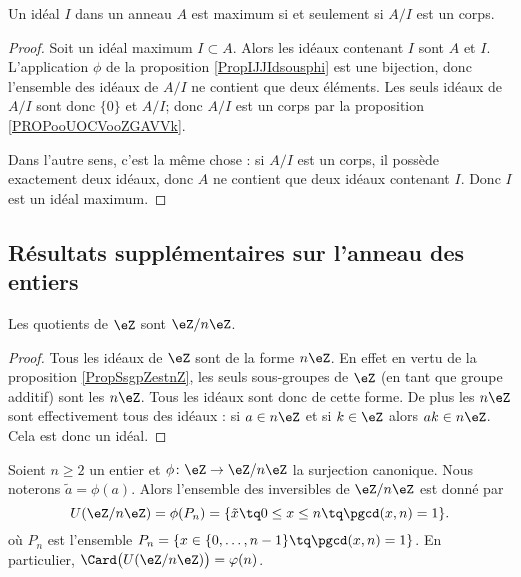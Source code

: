 \begin{proposition}     \label{PROPooSHHWooCyZPPw}
    Un idéal \( I\) dans un anneau $A$ est maximum si et seulement si \( A/I\) est un corps.
\end{proposition}

\begin{proof}
    Soit un idéal maximum \( I\subset A\). Alors les idéaux contenant \( I\) sont \( A\) et \( I\). L'application \( \phi\) de la proposition \ref{PropIJJIdsousphi} est une bijection, donc l'ensemble des idéaux de \( A/I\) ne contient que deux éléments. Les seuls idéaux de \( A/I\) sont donc \( \{ 0 \}\) et \( A/I\); donc \( A/I\) est un corps par la proposition \ref{PROPooUOCVooZGAVVk}.

    Dans l'autre sens, c'est la même chose : si \( A/I\) est un corps, il possède exactement deux idéaux, donc \( A\) ne contient que deux idéaux contenant $I$. Donc \( I\) est un idéal maximum.
\end{proof}

\subsection{Résultats supplémentaires sur l'anneau des entiers}

\begin{corollary}       \label{CORooLINXooBlUKPG}
    Les quotients de \( \eZ\) sont \( \eZ/n\eZ\).
\end{corollary}

\begin{proof}
    Tous les idéaux de \( \eZ\) sont de la forme \( n\eZ\). En effet en vertu de la proposition \ref{PropSsgpZestnZ}, les seuls sous-groupes de \( \eZ\) (en tant que groupe additif) sont les \( n\eZ\). Tous les idéaux sont donc de cette forme. De plus les \( n\eZ\) sont effectivement tous des idéaux : si \( a\in n\eZ\) et si \( k\in \eZ\) alors \( ak\in n\eZ\). Cela est donc un idéal.
\end{proof}

\begin{proposition}     \label{PropZpintssiprempUzn}
    Soient \( n\geq 2\) un entier et \( \phi\colon \eZ\to \eZ/n\eZ\) la surjection canonique. Nous noterons \( \tilde a=\phi(a)\). Alors l'ensemble des inversibles de \( \eZ/n\eZ\) est donné par
    \begin{equation}
        U(\eZ/n\eZ)=\phi(P_n)=\{ \tilde x\tq 0\leq x\leq n\tq\pgcd(x,n)=1 \}.
    \end{equation}
    où \( P_n\) est l'ensemble $P_n=\{ x\in\{ 0,\ldots,n-1 \}\tq\pgcd(x,n)=1 \}$. En particulier, \( \Card\big( U(\eZ/n\eZ) \big)=\varphi(n)\).
\end{proposition}

